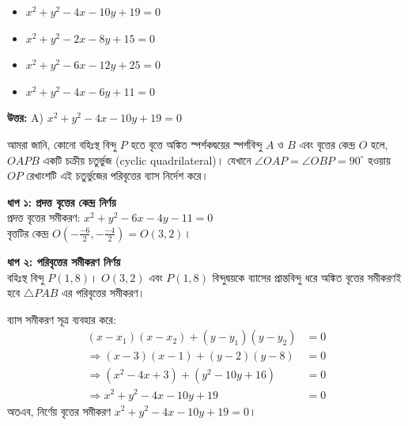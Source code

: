 \documentclass[12pt, a4paper]{article}
\begin{document}
\vspace{1em}
\begin{itemize}[label={}, leftmargin=1cm, itemsep=0.5em]
    \item[\textbf{A)}] $x^2 + y^2 - 4x - 10y + 19 = 0$
    \item[\textbf{B)}] $x^2 + y^2 - 2x - 8y + 15 = 0$
    \item[\textbf{C)}] $x^2 + y^2 - 6x - 12y + 25 = 0$
    \item[\textbf{D)}] $x^2 + y^2 - 4x - 6y + 11 = 0$
\end{itemize}

\vspace{0.5em}
\begin{tcolorbox}[answerbox]
    \textbf{\color{success} উত্তর:} A) $x^2 + y^2 - 4x - 10y + 19 = 0$
\end{tcolorbox}
\vspace{1em}

\begin{tcolorbox}[solutionbox={সমাধান (Solution)}]
    \noindent
    আমরা জানি, কোনো বহিঃস্থ বিন্দু $P$ হতে বৃত্তে অঙ্কিত স্পর্শকদ্বয়ের স্পর্শবিন্দু $A$ ও $B$ এবং বৃত্তের কেন্দ্র $O$ হলে, $OAPB$ একটি চক্রীয় চতুর্ভুজ (cyclic quadrilateral)। যেখানে $\angle OAP = \angle OBP = 90^{\circ}$ হওয়ায় $OP$ রেখাংশটি এই চতুর্ভুজের পরিবৃত্তের ব্যাস নির্দেশ করে।
    
    \vspace{0.5em}
    \noindent\textbf{ধাপ ১: প্রদত্ত বৃত্তের কেন্দ্র নির্ণয়} \\
    প্রদত্ত বৃত্তের সমীকরণ: $x^2 + y^2 - 6x - 4y - 11 = 0$ \\
    বৃত্তটির কেন্দ্র $O\left(-\frac{-6}{2}, -\frac{-4}{2}\right) = O(3, 2)$। 
    
    \vspace{0.5em}
    \noindent\textbf{ধাপ ২: পরিবৃত্তের সমীকরণ নির্ণয়} \\
    বহিঃস্থ বিন্দু $P(1, 8)$। $O(3, 2)$ এবং $P(1, 8)$ বিন্দুদ্বয়কে ব্যাসের প্রান্তবিন্দু ধরে অঙ্কিত বৃত্তের সমীকরণই হবে $\triangle PAB$ এর পরিবৃত্তের সমীকরণ।
    
    ব্যাস সমীকরণ সূত্র ব্যবহার করে:
    \begin{align*}
        (x - x_1)(x - x_2) + (y - y_1)(y - y_2) &= 0 \\
        \Rightarrow (x - 3)(x - 1) + (y - 2)(y - 8) &= 0 \\
        \Rightarrow (x^2 - 4x + 3) + (y^2 - 10y + 16) &= 0 \\
        \Rightarrow x^2 + y^2 - 4x - 10y + 19 &= 0
    \end{align*}
    অতএব, নির্ণেয় বৃত্তের সমীকরণ \textbf{$x^2 + y^2 - 4x - 10y + 19 = 0$}।
\end{tcolorbox}
\end{document}
